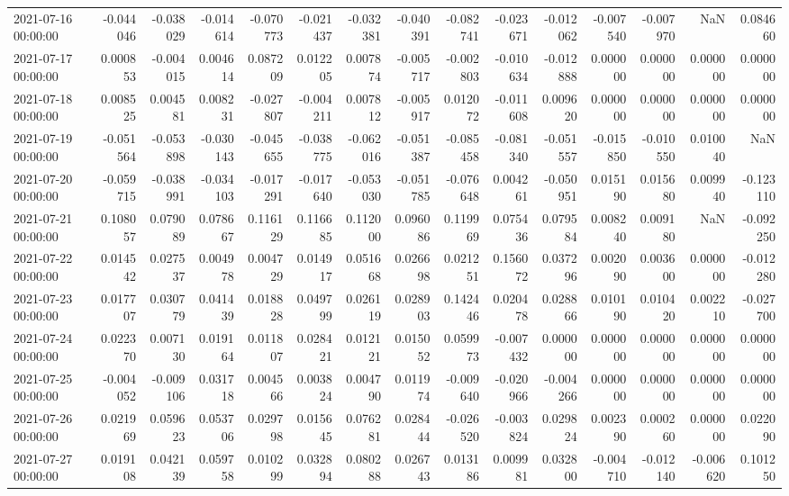 \begin{tabular}{lrrrrrrrrrrrrrr}
2021-07-16 00:00:00 & -0.044046 & -0.038029 & -0.014614 & -0.070773 & -0.021437 & -0.032381 & -0.040391 & -0.082741 & -0.023671 & -0.012062 & -0.007540 & -0.007970 & NaN & 0.084660 \\
2021-07-17 00:00:00 & 0.000853 & -0.004015 & 0.004614 & 0.087209 & 0.012205 & 0.007874 & -0.005717 & -0.002803 & -0.010634 & -0.012888 & 0.000000 & 0.000000 & 0.000000 & 0.000000 \\
2021-07-18 00:00:00 & 0.008525 & 0.004581 & 0.008231 & -0.027807 & -0.004211 & 0.007812 & -0.005917 & 0.012072 & -0.011608 & 0.009620 & 0.000000 & 0.000000 & 0.000000 & 0.000000 \\
2021-07-19 00:00:00 & -0.051564 & -0.053898 & -0.030143 & -0.045655 & -0.038775 & -0.062016 & -0.051387 & -0.085458 & -0.081340 & -0.051557 & -0.015850 & -0.010550 & 0.010040 & NaN \\
2021-07-20 00:00:00 & -0.059715 & -0.038991 & -0.034103 & -0.017291 & -0.017640 & -0.053030 & -0.051785 & -0.076648 & 0.004261 & -0.050951 & 0.015190 & 0.015680 & 0.009940 & -0.123110 \\
2021-07-21 00:00:00 & 0.108057 & 0.079089 & 0.078667 & 0.116129 & 0.116685 & 0.112000 & 0.096086 & 0.119969 & 0.075436 & 0.079584 & 0.008240 & 0.009180 & NaN & -0.092250 \\
2021-07-22 00:00:00 & 0.014542 & 0.027537 & 0.004978 & 0.004729 & 0.014917 & 0.051668 & 0.026698 & 0.021251 & 0.156072 & 0.037296 & 0.002090 & 0.003600 & 0.000000 & -0.012280 \\
2021-07-23 00:00:00 & 0.017707 & 0.030779 & 0.041439 & 0.018828 & 0.049799 & 0.026119 & 0.028903 & 0.142446 & 0.020478 & 0.028866 & 0.010190 & 0.010420 & 0.002210 & -0.027700 \\
2021-07-24 00:00:00 & 0.022370 & 0.007130 & 0.019164 & 0.011807 & 0.028421 & 0.012121 & 0.015052 & 0.059973 & -0.007432 & 0.000000 & 0.000000 & 0.000000 & 0.000000 & 0.000000 \\
2021-07-25 00:00:00 & -0.004052 & -0.009106 & 0.031718 & 0.004566 & 0.003824 & 0.004790 & 0.011974 & -0.009640 & -0.020966 & -0.004266 & 0.000000 & 0.000000 & 0.000000 & 0.000000 \\
2021-07-26 00:00:00 & 0.021969 & 0.059623 & 0.053706 & 0.029798 & 0.015645 & 0.076281 & 0.028444 & -0.026520 & -0.003824 & 0.029824 & 0.002390 & 0.000260 & 0.000000 & 0.022090 \\
2021-07-27 00:00:00 & 0.019108 & 0.042139 & 0.059758 & 0.010299 & 0.032894 & 0.080288 & 0.026743 & 0.013186 & 0.009981 & 0.032800 & -0.004710 & -0.012140 & -0.006620 & 0.101250 \\

\end{tabular}
